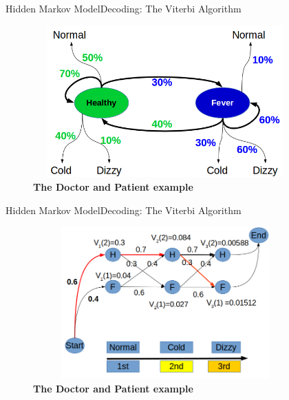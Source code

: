\documentclass[10pt]{beamer}
\begin{document}
\begin{frame}{Hidden Markov Model}{Decoding: The Viterbi Algorithm}
  \begin{figure}[h]
    \centering
    \includegraphics[width=4in,height=2.3in]{figures/doctor_example_01.png}
    \caption {\textbf{The Doctor and Patient example}}
  \end{figure}
\end{frame}

\begin{frame}{Hidden Markov Model}{Decoding: The Viterbi Algorithm}
  \begin{figure}[h]
    \centering
    \includegraphics[width=4in,height=2.3in]{figures/doctor_example_02.png}
    \caption {\textbf{The Doctor and Patient example}}
  \end{figure}
\end{frame}

\end{document}
